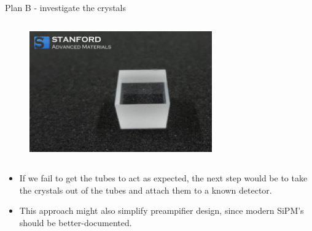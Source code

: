 \begin{columnframe}{Plan B - investigate the crystals}
    \begin{column}{0.5\textwidth}
        \begin{figure}
            \centering
            \includegraphics[width=0.7\textwidth]{images/bgo-scintillation-crystal_stanford.jpg}
        \end{figure}
    \end{column}
    \begin{column}{0.5\textwidth}
        \begin{itemize}
            \item If we fail to get the tubes to act as expected, the next step would be to take the crystals out of the tubes and attach them to a known detector.
            \item This approach might also simplify preampifier design, since modern SiPM's should be better-documented.
        \end{itemize}
    \end{column}
\end{columnframe}

